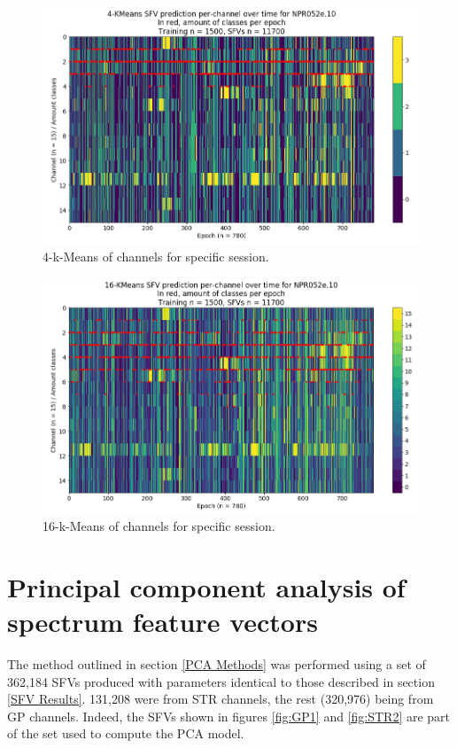 \documentclass{kththesis}
\begin{document}
\begin{figure}[H]
    \centering
    \centerline{\includegraphics[width=1\textwidth]{images/KM4.png}}
    \caption{4-k-Means of channels for specific session.}
    \label{fig:KM4}
\end{figure}

\begin{figure}[H]
    \centering
    \centerline{\includegraphics[width=1\textwidth]{images/KM16.png}}
    \caption{16-k-Means of channels for specific session.}
    \label{fig:KM16}
\end{figure}

\section{Principal component analysis of spectrum feature vectors}\label{PCA Results}

The method outlined in section \ref{PCA Methods} was performed using a set of 362,184 SFVs produced with parameters identical to those described in section \ref{SFV Results}.
131,208 were from STR channels, the rest (320,976) being from GP channels.
Indeed, the SFVs shown in figures \ref{fig:GP1} and \ref{fig:STR2} are part of the set used to compute the PCA model.
\end{document}

